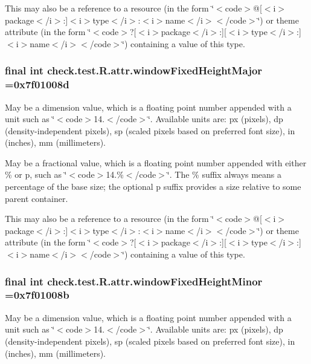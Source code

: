 This may also be a reference to a resource (in the form \char`\"{}$<$code$>$@\mbox{[}$<$i$>$package$<$/i$>$\+:\mbox{]}$<$i$>$type$<$/i$>$\+:$<$i$>$name$<$/i$>$$<$/code$>$\char`\"{}) or theme attribute (in the form \char`\"{}$<$code$>$?\mbox{[}$<$i$>$package$<$/i$>$\+:\mbox{]}\mbox{[}$<$i$>$type$<$/i$>$\+:\mbox{]}$<$i$>$name$<$/i$>$$<$/code$>$\char`\"{}) containing a value of this type. \hypertarget{classcheck_1_1test_1_1_r_1_1attr_a117326070fd6496640c70afd9d2eef7a}{}
\subsubsection[{window\+Fixed\+Height\+Major}]{\setlength{\rightskip}{0pt plus 5cm}final int check.\+test.\+R.\+attr.\+window\+Fixed\+Height\+Major =0x7f01008d\hspace{0.3cm}{\ttfamily [static]}}\label{classcheck_1_1test_1_1_r_1_1attr_a117326070fd6496640c70afd9d2eef7a}
May be a dimension value, which is a floating point number appended with a unit such as \char`\"{}$<$code$>$14.\+5sp$<$/code$>$\char`\"{}. Available units are\+: px (pixels), dp (density-\/independent pixels), sp (scaled pixels based on preferred font size), in (inches), mm (millimeters). 

May be a fractional value, which is a floating point number appended with either \% or p, such as \char`\"{}$<$code$>$14.\%$<$/code$>$\char`\"{}. The \% suffix always means a percentage of the base size; the optional p suffix provides a size relative to some parent container. 

This may also be a reference to a resource (in the form \char`\"{}$<$code$>$@\mbox{[}$<$i$>$package$<$/i$>$\+:\mbox{]}$<$i$>$type$<$/i$>$\+:$<$i$>$name$<$/i$>$$<$/code$>$\char`\"{}) or theme attribute (in the form \char`\"{}$<$code$>$?\mbox{[}$<$i$>$package$<$/i$>$\+:\mbox{]}\mbox{[}$<$i$>$type$<$/i$>$\+:\mbox{]}$<$i$>$name$<$/i$>$$<$/code$>$\char`\"{}) containing a value of this type. \hypertarget{classcheck_1_1test_1_1_r_1_1attr_af64ced39b1ccba05a90dd6826cc30e0c}{}
\subsubsection[{window\+Fixed\+Height\+Minor}]{\setlength{\rightskip}{0pt plus 5cm}final int check.\+test.\+R.\+attr.\+window\+Fixed\+Height\+Minor =0x7f01008b\hspace{0.3cm}{\ttfamily [static]}}\label{classcheck_1_1test_1_1_r_1_1attr_af64ced39b1ccba05a90dd6826cc30e0c}
May be a dimension value, which is a floating point number appended with a unit such as \char`\"{}$<$code$>$14.\+5sp$<$/code$>$\char`\"{}. Available units are\+: px (pixels), dp (density-\/independent pixels), sp (scaled pixels based on preferred font size), in (inches), mm (millimeters). 

